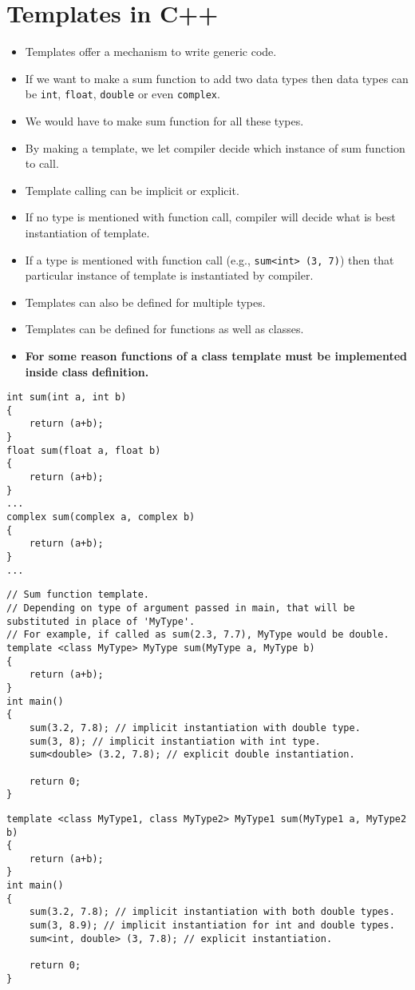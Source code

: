 \documentclass[12pt,a4paper]{article}
\begin{document}
\section{Templates in C++}
\begin{itemize}
\item Templates offer a mechanism to write generic code.
\item If we want to make a sum function to add two data types then data types can be \verb|int|, \verb|float|, \verb|double| or even \verb|complex|.
\item We would have to make sum function for all these types.
\item By making a template, we let compiler decide which instance of sum function to call.
\item Template calling can be implicit or explicit.
\item If no type is mentioned with function call, compiler will decide what is best instantiation of template.
\item If a type is mentioned with function call (e.g., \verb|sum<int> (3, 7)|) then that particular instance of template is instantiated by compiler.
\item Templates can also be defined for multiple types.
\item Templates can be defined for functions as well as classes.
\item \textbf{For some reason functions of a class template must be implemented inside class definition.}
\end{itemize}
\begin{lstlisting}[caption={Traditional way of writing sum function}]
int sum(int a, int b)
{
	return (a+b);
}
float sum(float a, float b)
{
	return (a+b);
}
...
complex sum(complex a, complex b)
{
	return (a+b);
}
...
\end{lstlisting}
\begin{lstlisting}[caption={Sum function template}]
// Sum function template.
// Depending on type of argument passed in main, that will be substituted in place of 'MyType'.
// For example, if called as sum(2.3, 7.7), MyType would be double.
template <class MyType> MyType sum(MyType a, MyType b)
{
	return (a+b);
}
int main()
{
	sum(3.2, 7.8); // implicit instantiation with double type.
	sum(3, 8); // implicit instantiation with int type.
	sum<double> (3.2, 7.8); // explicit double instantiation.
	
	return 0;
}
\end{lstlisting}
\begin{lstlisting}[caption={Sum function template for mixed types}]
template <class MyType1, class MyType2> MyType1 sum(MyType1 a, MyType2 b)
{
	return (a+b);
}
int main()
{
	sum(3.2, 7.8); // implicit instantiation with both double types.
	sum(3, 8.9); // implicit instantiation for int and double types.
	sum<int, double> (3, 7.8); // explicit instantiation.
	
	return 0;
}
\end{lstlisting}
\end{document}
